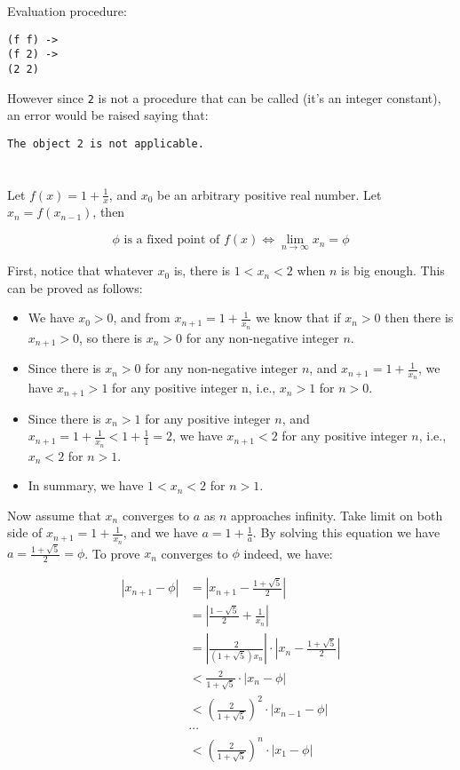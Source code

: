 \documentclass[../main.tex]{subfiles}
\begin{document}
Evaluation procedure:

\begin{lstlisting}
(f f) ->
(f 2) ->
(2 2)
\end{lstlisting}

However since \lstinline{2} is not a
 procedure that can be called (it's an
 integer constant), an error would be
 raised saying that:

\begin{lstlisting}
The object 2 is not applicable.
\end{lstlisting}


\section{}

Let $f(x)=1+\frac{1}{x}$, and $x_0$ be an arbitrary
 positive real number. Let $x_n=f(x_{n-1})$, then

$$
\phi\text{ is a fixed point of }f(x)\iff\lim_{n\to\infty}x_n=\phi
$$

First, notice that whatever $x_0$ is, there is
 $1<x_n<2$ when $n$ is big enough. This can be
 proved as follows:

\begin{itemize}
\item We have $x_0 > 0$, and from $x_{n+1}=1+\frac{1}{x_n}$ we
 know that if $x_n > 0$ then there is $x_{n+1} > 0$, so there is
 $x_n > 0$ for any non-negative integer $n$.
\item Since there is $x_n > 0$ for any non-negative integer $n$,
 and $x_{n+1}=1+\frac{1}{x_n}$, we have $x_{n+1} > 1$ for any
 positive integer n, i.e., $x_n > 1$ for $n > 0$.
\item Since there is $x_n > 1$ for any positive integer $n$,
 and $x_{n+1}=1+\frac{1}{x_n} < 1+\frac{1}{1} = 2$, we have
 $x_{n+1} < 2$ for any positive integer $n$, i.e., $x_n < 2$ for
 $n > 1$.
\item In summary, we have $1 < x_n < 2$ for $n > 1$.
\end{itemize}

Now assume that $x_n$ converges to $a$ as $n$ approaches infinity.
 Take limit on both side of $x_{n+1}=1+\frac{1}{x_n}$, and we have
 $a=1+\frac{1}{a}$. By solving this equation we have
 $a=\frac{1+\sqrt{5}}{2}=\phi$. To prove $x_n$ converges to $\phi$ indeed,
 we have:

\begin{align*}
|x_{n+1}-\phi| &= \left|x_{n+1}-\frac{1+\sqrt{5}}{2}\right| \\
&= \left|\frac{1-\sqrt{5}}{2}+\frac{1}{x_n}\right| \\
&= \left|\frac{2}{(1+\sqrt{5})x_n}\right|\cdot\left|x_n - \frac{1+\sqrt{5}}{2}\right| \\
&< \frac{2}{1+\sqrt{5}}\cdot|x_n - \phi| \\
&< \left(\frac{2}{1+\sqrt{5}}\right)^2\cdot|x_{n-1} - \phi| \\
&\cdots \\
&< \left(\frac{2}{1+\sqrt{5}}\right)^n\cdot|x_1 - \phi|
\end{align*}
\end{document}
